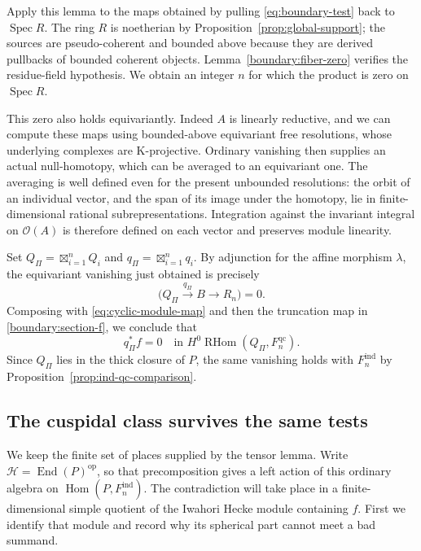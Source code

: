 \documentclass[11pt]{article}
\numberwithin{equation}{section}
\theoremstyle{definition}
\theoremstyle{remark}
\newcommand{\cO}{\mathcal O}
\newcommand{\Hom}{\operatorname{Hom}}
\newcommand{\RHom}{\operatorname{RHom}}
\newcommand{\End}{\operatorname{End}}
\newcommand{\Spec}{\operatorname{Spec}}
\begin{document}
Apply this lemma to the maps obtained by pulling
\eqref{eq:boundary-test} back to $\Spec R$.  The ring $R$ is noetherian
by Proposition~\ref{prop:global-support}; the sources are
pseudo-coherent and bounded above because they are derived pullbacks
of bounded coherent objects.  Lemma~\ref{boundary:fiber-zero} verifies
the residue-field hypothesis.  We obtain an integer $n$ for which the
product is zero on $\Spec R$.

This zero also holds equivariantly.  Indeed $A$ is linearly reductive,
and we can compute these maps using bounded-above equivariant free
resolutions, whose underlying complexes are K-projective.  Ordinary
vanishing then supplies an actual null-homotopy, which can be averaged
to an equivariant one.  The averaging is
well defined even for the present unbounded resolutions: the orbit of
an individual vector, and the span of its image under the homotopy,
lie in finite-dimensional rational subrepresentations.  Integration
against the invariant integral on $\cO(A)$ is therefore defined on each
vector and preserves module linearity.

Set $Q_\Pi=\boxtimes_{i=1}^nQ_i$ and
$q_\Pi=\boxtimes_{i=1}^nq_i$.  By adjunction for the affine morphism
$\lambda$, the equivariant vanishing just obtained is precisely
\begin{equation}\label{boundary:vanishing-through-support}
 \bigl(Q_\Pi\xrightarrow{q_\Pi}B\longrightarrow R_n\bigr)=0.
\end{equation}
Composing with \eqref{eq:cyclic-module-map} and then the truncation map
in \eqref{boundary:section-f}, we conclude that
\begin{equation}\label{boundary:f-vanishes}
 q_\Pi^*f=0\quad\text{in }H^0\RHom(Q_\Pi,F_n^{\mathrm{qc}}).
\end{equation}
Since $Q_\Pi$ lies in the thick closure of $P$, the same vanishing holds
with $F_n^{\mathrm{ind}}$ by
Proposition~\ref{prop:ind-qc-comparison}.

\subsection{The cuspidal class survives the same tests}

We keep the finite set of places supplied by the tensor lemma.  Write
$\mathcal H=\End(P)^{\mathrm{op}}$, so that precomposition gives a
left action of this ordinary algebra on $\Hom(P,F_n^{\mathrm{ind}})$.  The
contradiction will take place in a finite-dimensional simple quotient
of the Iwahori Hecke module containing $f$.  First we identify that
module and record why its spherical part cannot meet a bad summand.
\end{document}
